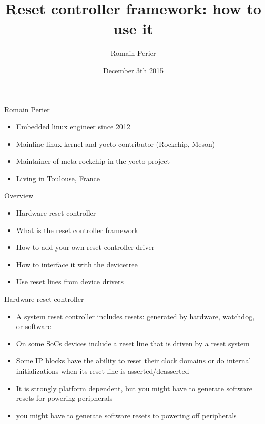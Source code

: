 \documentclass{beamer}
\title{Reset controller framework: how to use it}
\author{Romain Perier}
\institute{Embedded linux engineer and foss developer\newline romain.perier@gmail.com}
\date{December 3th 2015}
\begin{document}
\begin{frame}
\titlepage{}
\end{frame}

\begin{frame}{Romain Perier}
	\begin{itemize}
		\item Embedded linux engineer since 2012
		\item Mainline linux kernel and yocto contributor (Rockchip, Meson)
		\item Maintainer of meta-rockchip in the yocto project
		\item Living in Toulouse, France
	\end{itemize}
\end{frame}

\begin{frame}{Overview}
	\begin{itemize}
		\item Hardware reset controller
		\item What is the reset controller framework
		\item How to add your own reset controller driver
		\item How to interface it with the devicetree
		\item Use reset lines from device drivers
	\end{itemize}
\end{frame}

\begin{frame}{Hardware reset controller}
	\begin{itemize}
		\item A system reset controller includes resets: generated by hardware, watchdog, or software
		\item On some SoCs devices include a reset line that is driven by a reset system
		\item Some IP blocks have the ability to reset their clock domains or do internal initializations when its reset line is asserted/deasserted
		\item It is strongly platform dependent, but you might have to generate software resets for powering peripherals
		\item you might have to generate software resets to powering off peripherals
	\end{itemize}
\end{frame}
\end{document}
